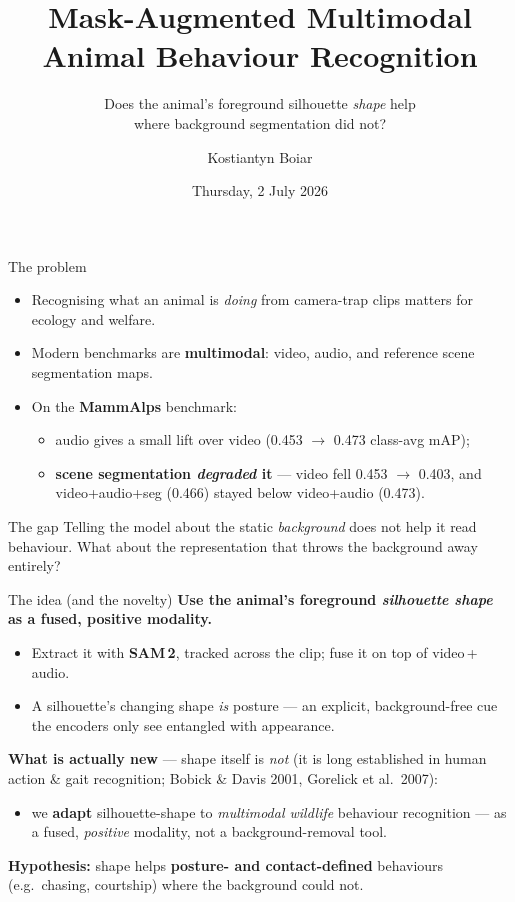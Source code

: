 \documentclass[aspectratio=169,11pt]{beamer}
\title[Mask-Augmented Behaviour Recognition]{Mask-Augmented Multimodal\\ Animal Behaviour Recognition}
\subtitle{Does the animal's foreground silhouette \emph{shape} help\\ where background segmentation did not?}
\author{Kostiantyn Boiar}
\institute{MSc Dissertation, University of Glasgow \\ Supervisor: Dr Marwa Mahmoud}
\date{Thursday, 2 July 2026}
\begin{document}
\begin{frame}[plain]
  \titlepage
\end{frame}

\begin{frame}{The problem}
  \begin{itemize}
    \item Recognising what an animal is \emph{doing} from camera-trap clips matters for
          ecology and welfare.
    \item Modern benchmarks are \textbf{multimodal}: video, audio, and reference scene
          segmentation maps.
    \item On the \textbf{MammAlps} benchmark:
      \begin{itemize}
        \item audio gives a small lift over video (0.453 $\to$ 0.473 class-avg mAP);
        \item \textbf{scene segmentation \emph{degraded} it} --- video fell 0.453 $\to$
              0.403, and video+audio+seg (0.466) stayed below video+audio (0.473).
      \end{itemize}
  \end{itemize}
  \vfill
  \begin{block}{The gap}
    Telling the model about the static \emph{background} does not help it read behaviour.
    What about the representation that throws the background away entirely?
  \end{block}
\end{frame}

\begin{frame}{The idea (and the novelty)}
  \textbf{Use the animal's foreground \emph{silhouette shape} as a fused, positive modality.}
  \begin{itemize}
    \item Extract it with \textbf{SAM\,2}, tracked across the clip; fuse it on top of
          video\,+\,audio.
    \item A silhouette's changing shape \emph{is} posture --- an explicit, background-free
          cue the encoders only see entangled with appearance.
  \end{itemize}
  \vfill
  \textbf{What is actually new} --- shape itself is \emph{not} (it is long established in
  human action \& gait recognition; Bobick \& Davis 2001, Gorelick et al.\ 2007):
  \begin{itemize}
    \item we \textbf{adapt} silhouette-shape to \emph{multimodal wildlife} behaviour
          recognition --- as a fused, \emph{positive} modality, not a background-removal tool.
  \end{itemize}
  \vfill
  \textbf{Hypothesis:} shape helps \textbf{posture- and contact-defined} behaviours
  (e.g.\ chasing, courtship) where the background could not.
\end{frame}
\end{document}
